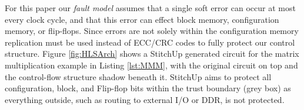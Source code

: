 For this paper our \emph{fault model} assumes that a single soft error
can occur at most every clock cycle, and that this error can effect block memory,
configuration memory, or flip-flops.
Since errors are not solely within the configuration memory replication must be used
instead of ECC/CRC codes to fully protect our control structure.
Figure \ref{fig:HLSArch} shows a StitchUp generated circuit for the matrix multiplication
example in Listing \ref{lst:MMM}, with the original circuit on top and the
control-flow structure shadow beneath it.
StitchUp aims to protect all configuration, block, and Flip-flop bits within the
trust boundary (grey box) as everything outside, such as routing to
external I/O or DDR, is not protected.

